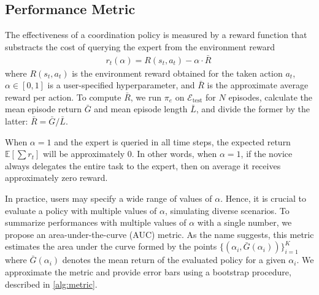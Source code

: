 \subsection{Performance Metric}

The effectiveness of a coordination policy is measured by a reward function that substracts the cost of querying the expert from the environment reward 
\begin{align}
    r_t(\alpha) = R(s_t, a_t) - \alpha \cdot \bar R  \ 
\end{align} where $ R(s_t, a_t)$ is the environment reward obtained for the taken action $a_t$, $\alpha \in [0, 1]$ is a user-specified hyperparameter, and $\bar R$ is the approximate average reward per action.
To compute $\bar R$, we run $\pi_e$ on $\mathcal{E}_{\text{test}}$ for $N$ episodes, calculate the mean episode return $\bar{G}$ and mean episode length $\bar{L}$, and divide the former by the latter: $\bar R = \bar G / \bar L$.

When $\alpha = 1$ and the expert is queried in all time steps, the expected return $\mathbb{E}[\sum r_t]$ will be approximately $0$. 
In other words, when $\alpha = 1$, if the novice always delegates the entire task to the expert, then on average  it receives approximately zero reward.

In practice, users may specify a wide range of values of $\alpha$.
Hence, it is crucial to evaluate a policy with multiple values of $\alpha$, simulating diverse scenarios.
To summarize performances with multiple values of $\alpha$ with a single number, we propose an area-under-the-curve (AUC) metric. 
As the name suggests, this metric estimates the area under the curve formed by the points $\{(\alpha_i, \bar G(\alpha_i))\}_{i = 1}^K$ where $\bar G(\alpha_i)$ denotes the mean return of the evaluated policy for a given $\alpha_i$.
We approximate the metric and provide error bars using a bootstrap procedure, described in \autoref{alg:metric}. 


